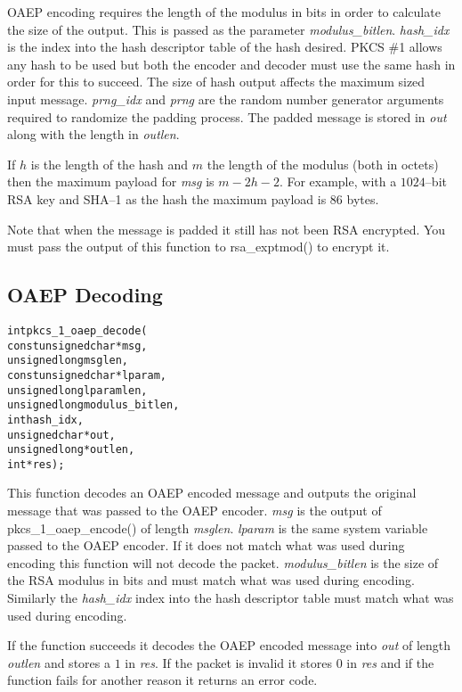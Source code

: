 \documentclass[synpaper]{book}
\begin{document}
OAEP encoding requires the length of the modulus in bits in order to calculate the size of the output.  This is passed as the parameter
\textit{modulus\_bitlen}.  \textit{hash\_idx} is the index into the hash descriptor table of the hash desired.  PKCS \#1 allows any hash to be
used but both the encoder and decoder must use the same hash in order for this to succeed.  The size of hash output affects the maximum
 sized input message.  \textit{prng\_idx} and \textit{prng} are the random number generator arguments required to randomize the padding process.
The padded message is stored in \textit{out} along with the length in \textit{outlen}.

If $h$ is the length of the hash and $m$ the length of the modulus (both in octets) then the maximum payload for \textit{msg} is
$m - 2h - 2$.  For example, with a $1024$--bit RSA key and SHA--1 as the hash the maximum payload is $86$ bytes.

Note that when the message is padded it still has not been RSA encrypted.  You must pass the output of this function to
rsa\_exptmod() to encrypt it.

\subsection{OAEP Decoding}

\begin{alltt}
int pkcs_1_oaep_decode(
    const unsigned char *msg,
          unsigned long  msglen,
    const unsigned char *lparam,
          unsigned long  lparamlen,
          unsigned long  modulus_bitlen,
                    int  hash_idx,
          unsigned char *out,
          unsigned long *outlen,
                    int *res);
\end{alltt}

This function decodes an OAEP encoded message and outputs the original message that was passed to the OAEP encoder.  \textit{msg} is the
output of pkcs\_1\_oaep\_encode() of length \textit{msglen}.  \textit{lparam} is the same system variable passed to the OAEP encoder.  If it does not
match what was used during encoding this function will not decode the packet.  \textit{modulus\_bitlen} is the size of the RSA modulus in bits
and must match what was used during encoding.  Similarly the \textit{hash\_idx} index into the hash descriptor table must match what was used
during encoding.

If the function succeeds it decodes the OAEP encoded message into \textit{out} of length \textit{outlen} and stores a
$1$ in \textit{res}.  If the packet is invalid it stores $0$ in \textit{res} and if the function fails for another reason
it returns an error code.
\end{document}
